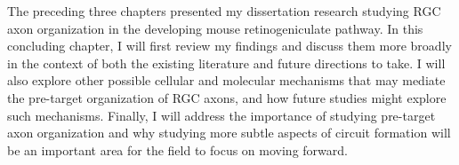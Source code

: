 The preceding three chapters presented my dissertation research studying RGC axon organization in the developing mouse retinogeniculate pathway.
In this concluding chapter, I will first review my findings and discuss them more broadly in the context of both the existing literature and future directions to take.
I will also explore other possible cellular and molecular mechanisms that may mediate the pre-target organization of RGC axons, and how future studies might explore such mechanisms.
Finally, I will address the importance of studying pre-target axon organization and why studying more subtle aspects of circuit formation will be an important area for the field to focus on moving forward.